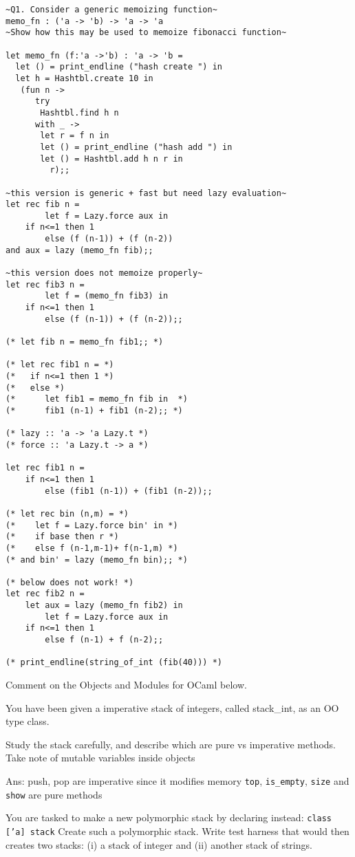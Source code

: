 \documentclass[fontsize=10pt]{slnotes}
\begin{document}
\begin{lstlisting}[escapechar=\~,escapebegin=\rmfamily,language={[Objective]Caml}]
~Q1. Consider a generic memoizing function~
memo_fn : ('a -> 'b) -> 'a -> 'a
~Show how this may be used to memoize fibonacci function~

let memo_fn (f:'a ->'b) : 'a -> 'b =
  let () = print_endline ("hash create ") in
  let h = Hashtbl.create 10 in
   (fun n ->
      try
       Hashtbl.find h n
      with _ ->
       let r = f n in
       let () = print_endline ("hash add ") in
       let () = Hashtbl.add h n r in
         r);;

~this version is generic + fast but need lazy evaluation~
let rec fib n =
        let f = Lazy.force aux in
	if n<=1 then 1
        else (f (n-1)) + (f (n-2))
and aux = lazy (memo_fn fib);;

~this version does not memoize properly~
let rec fib3 n =
        let f = (memo_fn fib3) in
	if n<=1 then 1
        else (f (n-1)) + (f (n-2));;

(* let fib n = memo_fn fib1;; *)

(* let rec fib1 n = *)
(*   if n<=1 then 1 *)
(*   else *)
(*      let fib1 = memo_fn fib in  *)
(*      fib1 (n-1) + fib1 (n-2);; *)

(* lazy :: 'a -> 'a Lazy.t *)
(* force :: 'a Lazy.t -> a *)

let rec fib1 n =
	if n<=1 then 1
        else (fib1 (n-1)) + (fib1 (n-2));;

(* let rec bin (n,m) = *)
(*    let f = Lazy.force bin' in *)
(*    if base then r *)
(*    else f (n-1,m-1)+ f(n-1,m) *)
(* and bin' = lazy (memo_fn bin);; *)

(* below does not work! *)
let rec fib2 n =
	let aux = lazy (memo_fn fib2) in
        let f = Lazy.force aux in
	if n<=1 then 1
        else f (n-1) + f (n-2);;

(* print_endline(string_of_int (fib(40))) *)
\end{lstlisting}
Comment on the Objects and Modules for OCaml below.

You have been given a imperative stack of integers,
called stack\_int, as an OO type class.

Study the stack carefully, and describe which are
pure vs imperative methods. Take note of mutable
variables inside objects

Ans: push, pop are imperative since it modifies memory
\texttt{top}, \texttt{is\_empty}, \texttt{size} and \texttt{show} are pure methods

You are tasked to make a new polymorphic stack by
    declaring instead:
    \texttt{class ['a] stack}
    Create such a polymorphic stack.
    Write test harness that would then creates two stacks:
      (i) a stack of integer and
      (ii) another stack of strings.
\end{document}
